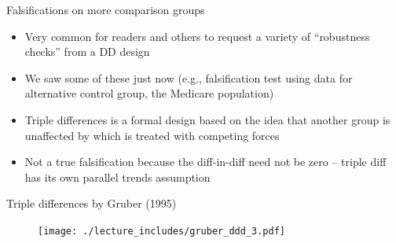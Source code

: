 \documentclass{beamer}
\begin{document}
\begin{frame}{Falsifications on more comparison groups}
	
	\begin{itemize}
	\item Very common for readers and others to request a variety of ``robustness checks'' from a DD design
	\item We saw some of these just now (e.g., falsification test using data for alternative control group, the Medicare population)
	\item Triple differences is a formal design based on the idea that another group is unaffected by which is treated with competing forces
	\item Not a true falsification because the diff-in-diff need not be zero -- triple diff has its own parallel trends assumption
	\end{itemize}
\end{frame}

\begin{frame}{Triple differences by Gruber (1995)}
	
	\begin{figure}
	\texttt{[image: ./lecture\_includes/gruber\_ddd\_3.pdf]}
	\end{figure}
	
\end{frame}
\end{document}
